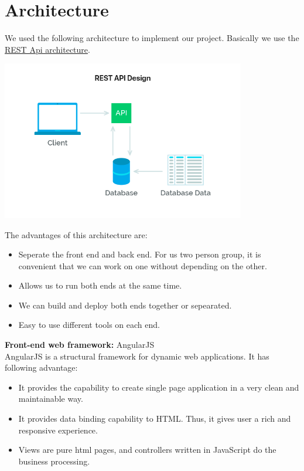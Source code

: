 \documentclass[a4paper,12pt]{article} %
\begin{document}
\section{Architecture}
We used the following architecture to implement our project. Basically we use the \href{https://mlsdev.com/blog/81-a-beginner-s-tutorial-for-understanding-restful-api}{REST Api architecture}. 
\begin{center}
\includegraphics[width=0.8\textwidth]{REST}
\end{center}
The advantages of this architecture are:
\begin{itemize}
    \item Seperate the front end and back end. For us two person group, it is convenient that we can work on one
    without depending on the other.
    \item Allows us to run both ends at the same time.
    \item We can build and deploy both ends together or sepearated.
    \item Easy to use different tools on each end.
\end{itemize}
\textbf{Front-end web framework:} AngularJS\\[5pt]
AngularJS is a structural framework for dynamic web applications. It has following advantage:
\begin{itemize}
    \item It provides the capability to create single page application in a very clean and maintainable way. 
    \item It provides data binding capability to HTML. Thus, it gives user a rich and responsive experience.
    \item Views are pure html pages, and controllers written in JavaScript do the business processing.
\end{itemize}
\end{document}
